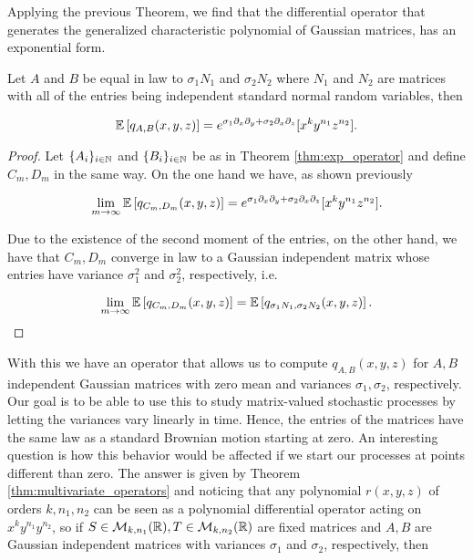     Applying the previous Theorem, we find that the differential operator that generates the generalized characteristic polynomial of Gaussian matrices, has an exponential form.

    \begin{corollary}
        Let $A$ and $B$ be equal in law to $\sigma_1 N_1$ and $\sigma_2 N_2$ where $N_1$ and $N_2$ are matrices with all of the entries being independent standard normal random variables, then
        
        \begin{equation*}
            \mathbb E \left[  q_{A,B}(x,y,z)  \right] = e^{\sigma_1 \partial_x \partial_y + \sigma_2 \partial_x \partial_z}[x^k y^{n_1} z^{n_2}].
        \end{equation*}
        \end{corollary}

        \begin{proof}
            Let $\{A_i\}_{i\in \mathbb N}$ and $\{B_i\}_{i\in \mathbb N}$ be as in Theorem \ref{thm:exp_operator} and define $C_m, D_m$ in the same way. On the one hand we have, as shown previously

            \begin{equation*}
                \lim_{m\to \infty} \mathbb E \left[  q_{C_m,D_m}(x,y,z) \right] =  e^{\sigma_1 \partial_x \partial_y + \sigma_2 \partial_x \partial_z}[x^k y^{n_1} z^{n_2}].
            \end{equation*}

            Due to the existence of the second moment of the entries, on the other hand, we have that $C_m, D_m$ converge in law to a Gaussian independent matrix whose entries have variance $\sigma_1^2$ and $\sigma_2^2$, respectively, i.e.

            \begin{equation*}
                \lim_{m\to \infty} \mathbb E \left[  q_{C_m,D_m}(x,y,z) \right] = \mathbb E \left[  q_{\sigma_1 N_1, \sigma_2 N_2}(x,y,z) \right].
            \end{equation*}        
        \end{proof}

        With this we have an operator that allows us to compute $q_{A,B}(x,y,z)$ for $A,B$ independent Gaussian matrices with zero mean and variances $\sigma_1,\sigma_2$, respectively. Our goal is to be able to use this to study matrix-valued stochastic processes by letting the variances vary linearly in time. Hence, the entries of the matrices have the same law as a standard Brownian motion starting at zero. An interesting question is how this behavior would be affected if we start our processes at points different than zero. The answer is given by Theorem \ref{thm:multivariate_operators} and noticing that any polynomial $r(x,y,z)$ of orders $k,n_1,n_2$ can be seen as a polynomial differential operator acting on $x^ky^{n_1}y^{n_2}$, so if $S\in \mathcal M_{k,n_1}(\mathbb R),T\in \mathcal M_{k,n_2}(\mathbb R)$ are fixed matrices and $A, B$ are Gaussian independent matrices with variances $\sigma_1$ and $\sigma_2$, respectively, then


